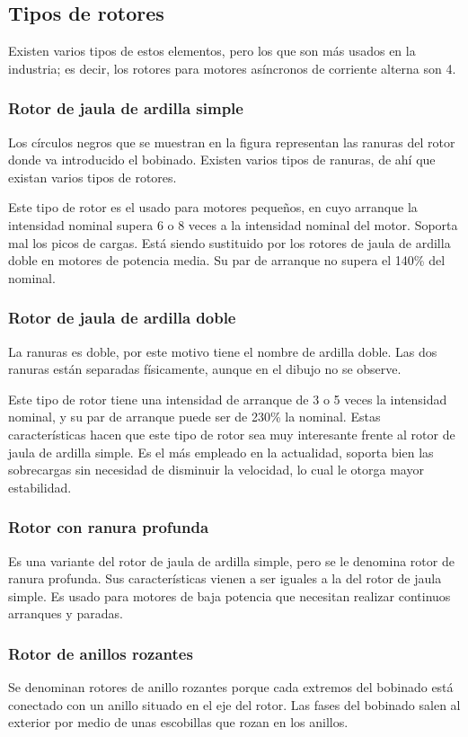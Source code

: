 \documentclass[a4paper,12pt]{article}
\begin{document}
\subsection{Tipos de rotores}
Existen varios tipos de estos elementos, pero los que son más usados en la industria; es decir, los rotores para motores asíncronos de corriente alterna son 4.
\subsubsection{Rotor de jaula de ardilla simple}
Los círculos negros que se muestran en la figura representan las ranuras del rotor donde va introducido el bobinado. Existen varios tipos de ranuras, de ahí que existan varios tipos de rotores.

Este tipo de rotor es el usado para motores pequeños, en cuyo arranque la intensidad nominal supera 6 o 8 veces a la intensidad nominal del motor. Soporta mal los picos de cargas. Está siendo sustituido por los rotores de jaula de ardilla doble en motores de potencia media. Su par de arranque no supera el 140\% del nominal. 
\subsubsection{Rotor de jaula de ardilla doble}
La ranuras es doble, por este motivo tiene el nombre de ardilla doble. Las dos ranuras están separadas físicamente, aunque en el dibujo no se observe.

Este tipo de rotor tiene una intensidad de arranque de 3 o 5 veces la intensidad nominal, y su par de arranque puede ser de 230\% la nominal. Estas características hacen que este tipo de rotor sea muy interesante frente al rotor de jaula de ardilla simple. Es el más empleado en la actualidad, soporta bien las sobrecargas sin necesidad de disminuir la velocidad, lo cual le otorga mayor estabilidad.
\subsubsection{Rotor con ranura profunda}
Es una variante del rotor de jaula de ardilla simple, pero se le denomina rotor de ranura profunda. Sus características vienen a ser iguales a la del rotor de jaula simple. Es usado para motores de baja potencia que necesitan realizar continuos arranques y paradas.
\subsubsection{Rotor de anillos rozantes}
Se denominan rotores de anillo rozantes porque cada extremos del bobinado está conectado con un anillo situado en el eje del rotor. Las fases del bobinado salen al exterior por medio de unas escobillas que rozan en los anillos.
\end{document}
